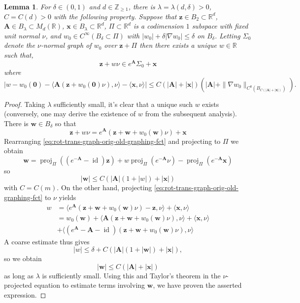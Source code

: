 \documentclass[11pt, letterpaper, reqno]{amsart}
\numberwithin{equation}{section}
\newtheorem{Lem}[Def]{Lemma}
\theoremstyle{remark}
\newcommand{\RR}{\mathbb{R}}
\newcommand{\ZZ}{\mathbb{Z}}
\newcommand{\mbfA}{\mathbf{A}}
\newcommand{\mbfw}{\mathbf{w}}
\newcommand{\mbfx}{\mathbf{x}}
\newcommand{\mbfz}{\mathbf{z}}
\newcommand{\proj}{\operatorname{proj}}
\newcommand{\Id}{\operatorname{id}}
\newcommand{\orig}{\mathbf{0}}
\begin{document}
\begin{Lem}\label{Lem:affine-acting-graph}
For $\delta \in (0,1)$ and $d \in \ZZ_{\geq 1}$, there is $\lambda=\lambda(d,\delta)>0$, $C=C(d)>0$ with the following property. Suppose that $\mbfz \in B_2 \subset \RR^d$, $\mbfA \in B_\lambda \subset M_d(\RR)$, $\mbfx \in B_\lambda \subset \RR^d$, $\Pi\subset \RR^d$ is a codimension $1$ subspace with fixed unit normal $\nu$, and $w_0 \in C^\infty(B_\delta \subset \Pi)$ with $|w_0| + \delta |\nabla w_0| \leq \delta$ on $B_\delta$. Letting $\Sigma_0$ denote the $\nu$-normal graph of $w_0$ over $\mbfz + \Pi$ then there exists a unique $w\in \RR$ such that,
\[
\mbfz + w \nu \in e^{\mbfA} \Sigma_0 + \mbfx
\]
where 
\[
|w - w_0(\orig) - \langle \mbfA(\mbfz  + w_0(\orig)\nu),\nu \rangle - \langle \mbfx,\nu\rangle| \leq C( |\mbfA| + |\mbfx|) (|\mbfA| + \|\nabla w_0\|_{C^0(B_{C(|\mbfA|+|\mbfx|)})}). 
\]
\end{Lem}
\begin{proof}
Taking $\lambda$ sufficiently small, it's clear that a unique such $w$ exists (conversely, one may derive the existence of $w$ from the subsequent analysis). There is $\mbfw \in B_\delta$ so that 
\begin{equation}\label{eq:rot-trans-graph-orig-old-graphing-fct}
\mbfz + w \nu = e^\mbfA(\mbfz +\mbfw +  w_0(\mbfw)\nu) + \mbfx
\end{equation}
Rearranging \eqref{eq:rot-trans-graph-orig-old-graphing-fct} and projecting to $\Pi$ we obtain
\[
 \mbfw = \proj_\Pi((e^{-\mbfA}-\Id) \mbfz) + w\proj_\Pi(e^{-\mbfA}\nu) - \proj_\Pi(e^{-\mbfA}\mbfx)
\]
so 
\[
|\mbfw | \leq C(|\mbfA| (1+|w|) + |\mbfx|)
\]
with $C=C(m)$. On the other hand, projecting \eqref{eq:rot-trans-graph-orig-old-graphing-fct} to $\nu$ yields 
\begin{align*}
w & = \langle e^\mbfA(\mbfz + \mbfw + w_0(\mbfw)\nu) - \mbfz,\nu\rangle + \langle \mbfx ,\nu\rangle\\
& = w_0(\mbfw) + \langle \mbfA(\mbfz + \mbfw + w_0(\mbfw)\nu),\nu \rangle + \langle \mbfx,\nu\rangle\\
&  + \langle(e^\mbfA - \mbfA - \Id)(\mbfz + \mbfw + w_0(\mbfw)\nu),\nu \rangle
\end{align*}
A coarse estimate thus gives 
\[
|w| \leq \delta + C(|\mbfA|(1+|\mbfw|) + |\mbfx|),
\]
so we obtain
\[
|\mbfw| \leq C(|\mbfA| + |\mbfx|)
\]
as long as $\lambda$ is sufficiently small. Using this and Taylor's theorem in the $\nu$-projected equation to estimate terms involving $\mbfw$, we have proven the asserted expression.
\end{proof}
\end{document}
